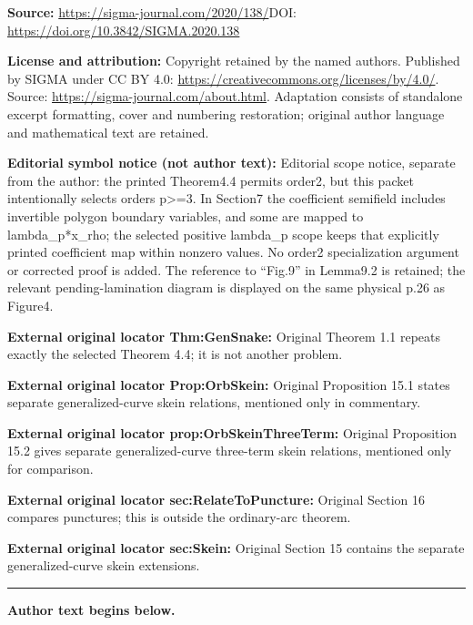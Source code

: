 \documentclass[11pt]{article}
\numberwithin{equation}{section}
\begin{document}
\noindent\textbf{Source:} \url{https://sigma-journal.com/2020/138/}\quad DOI: \url{https://doi.org/10.3842/SIGMA.2020.138}\par
\noindent\textbf{License and attribution:} Copyright retained by the named authors. Published by SIGMA under CC BY 4.0: \url{https://creativecommons.org/licenses/by/4.0/}. Source: \url{https://sigma-journal.com/about.html}. Adaptation consists of standalone excerpt formatting, cover and numbering restoration; original author language and mathematical text are retained.\par
\noindent\textbf{Editorial symbol notice (not author text):} Editorial scope notice, separate from the author: the printed Theorem4.4 permits order2, but this packet intentionally selects orders p>=3. In Section7 the coefficient semifield includes invertible polygon boundary variables, and some are mapped to lambda\_p*x\_rho; the selected positive lambda\_p scope keeps that explicitly printed coefficient map within nonzero values. No order2 specialization argument or corrected proof is added. The reference to “Fig.9” in Lemma9.2 is retained; the relevant pending-lamination diagram is displayed on the same physical p.26 as Figure4.\par
\noindent\textbf{External original locator Thm:GenSnake:} Original Theorem 1.1 repeats exactly the selected Theorem 4.4; it is not another problem.\par
\noindent\textbf{External original locator Prop:OrbSkein:} Original Proposition 15.1 states separate generalized-curve skein relations, mentioned only in commentary.\par
\noindent\textbf{External original locator prop:OrbSkeinThreeTerm:} Original Proposition 15.2 gives separate generalized-curve three-term skein relations, mentioned only for comparison.\par
\noindent\textbf{External original locator sec:RelateToPuncture:} Original Section 16 compares punctures; this is outside the ordinary-arc theorem.\par
\noindent\textbf{External original locator sec:Skein:} Original Section 15 contains the separate generalized-curve skein extensions.\par
\medskip\hrule\medskip\noindent\textbf{Author text begins below.}\par
\setcounter{section}{1}
\setcounter{subsection}{0}
\setcounter{subsubsection}{0}
\setcounter{Theorem}{1}
\setcounter{equation}{0}
\end{document}
